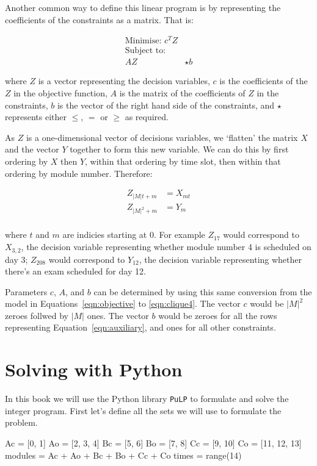 Another common way to define this linear program is by representing the
coefficients of the constraints as a matrix.
That is:

\begin{align}
\text{Minimise: } c^T Z & \\
\text{Subject to: } & \nonumber \\
A Z & \star b
\end{align}

where $Z$ is a vector representing the decision variables, $c$ is the
coefficients of the $Z$ in the objective function, $A$ is the matrix of
the coefficients of $Z$ in the constraints, $b$ is the vector of the
right hand side of the constraints, and $\star$ represents either $\leq$, $=$ or
$\geq$ as required.

As $Z$ is a one-dimensional vector of decisions variables, we `flatten'
the matrix $X$ and the vector $Y$ together to form this new variable.
We can do this by first ordering by $X$ then $Y$, within that
ordering by time slot, then within that ordering by module number.
Therefore:

\begin{align}
Z_{|M|t + m} &= X_{mt}\\
Z_{|M|^2 + m} &= Y_m\\
\end{align}

where $t$ and $m$ are indicies starting at 0.
For example $Z_{17}$ would correspond to $X_{3, 2}$, the decision variable
representing whether module number 4 is scheduled on day 3; $Z_{208}$ would
correspond to $Y_{12}$, the decision variable representing whether there's an
exam scheduled for day 12.

Parameters $c$, $A$, and $b$ can be determined by using this same conversion
from the model in Equations~\ref{eqn:objective} to \ref{eqn:clique4}.
The vector $c$ would be $|M|^2$ zeroes follwed by $|M|$ ones.
The vector $b$ would be zeroes for all the rows representing
Equation~\ref{eqn:auxiliary}, and ones for all other constraints.


\section{Solving with Python}\label{sec:solving-with-python}
In this book we will use the Python library \texttt{PuLP} to
formulate and solve the integer program. First let's define all the sets we
will use to formulate the problem.

\begin{pyin}
Ac = [0, 1]
Ao = [2, 3, 4]
Bc = [5, 6]
Bo = [7, 8]
Cc = [9, 10]
Co = [11, 12, 13]
modules = Ac + Ao + Bc + Bo + Cc + Co
times = range(14)
\end{pyin}


